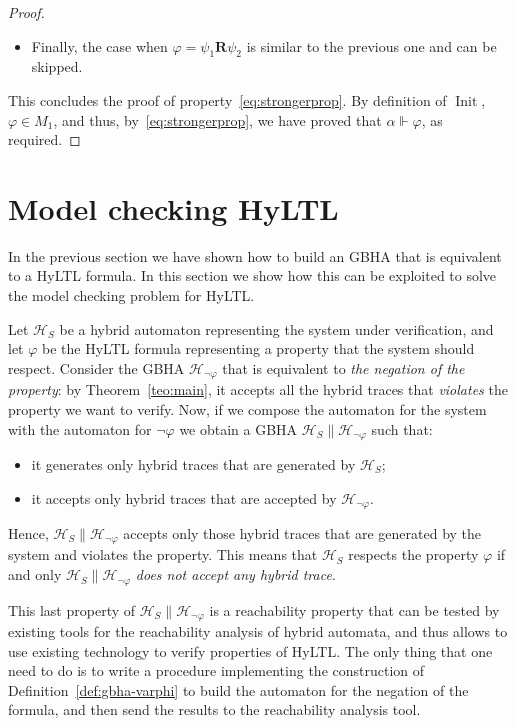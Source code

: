 \documentclass[submission,copyright,creativecommons]{eptcs}
\newcommand{\hyltl}{\textsf{HyLTL}\xspace}
\newcommand{\R}{\ensuremath{\mathbin{\mathbf{R}}}\xspace}
\newcommand{\mmodels}{\Vdash}
\newcommand{\autH}{\mathcal{H}}
\DeclareMathOperator{\Init}{{Init}}
\begin{document}
\begin{proof}
\begin{itemize}
	\item Finally, the case when $\varphi = \psi_1\R\psi_2$ is similar to the previous one and can be skipped.
\end{itemize}

\noindent This concludes the proof of property~\eqref{eq:strongerprop}. By definition of $\Init$, $\varphi\in M_1$, and thus, by~\eqref{eq:strongerprop}, we have proved that $\alpha \mmodels \varphi$, as required.
\end{proof}

\section{Model checking \hyltl}

In the previous section we have shown how to build an GBHA that is equivalent to a \hyltl formula. In this section we show how this can be exploited to solve the model checking problem for \hyltl. 

Let $\autH_S$ be a hybrid automaton representing the system under verification, and let $\varphi$ be the \hyltl formula representing a property that the system should respect. Consider the GBHA $\autH_{\neg\varphi}$ that is equivalent to \emph{the negation of the property}: by Theorem~\ref{teo:main}, it accepts all the hybrid traces that \emph{violates} the property we want to verify. Now, if we compose the automaton for the system with the automaton for $\neg\varphi$ we obtain a GBHA $\autH_S \| \autH_{\neg\varphi}$ such that:
\begin{itemize}
	\item it generates only hybrid traces that are generated by $\autH_S$;
	\item it accepts only hybrid traces that are accepted by $\autH_{\neg\varphi}$.
\end{itemize}

\noindent Hence, $\autH_S \| \autH_{\neg\varphi}$ accepts only those hybrid traces that are generated by the system and violates the property. This means that $\autH_S$ respects the property $\varphi$  if and only $\autH_S \| \autH_{\neg\varphi}$ \emph{does not accept any hybrid trace}.

This last property of $\autH_S \| \autH_{\neg\varphi}$ is a reachability property that can be tested by existing tools for the reachability analysis of hybrid automata, and thus allows to use existing technology to verify properties of \hyltl. The only thing that one need to do is to write a procedure implementing the construction of Definition~\ref{def:gbha-varphi} to build the automaton for the negation of the formula, and then send the results to the reachability analysis tool.
\end{document}
